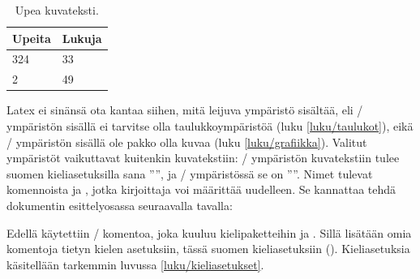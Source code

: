 \begin{esimerkki*}

\begin{koodilohko}
\begin{table}
  \begin{center}
    \renewcommand{\arraystretch}{1.3}
    \begin{tabular}{ll}
      Upeita & Lukuja \\
      \hline
      324 & 33 \\
      2   & 49 \\
      \hline
    \end{tabular}
  \end{center}
  \caption{Upea kuvateksti.}
\end{table}
\end{koodilohko}

  \caption{Leijuvan taulukon toteuttaminen \-/
    ympäristön avulla. Varsinainen taulukko syntyy ympäristön
     avulla}
  \label{esim/leijuosat-perus}
\end{esimerkki*}

Latex ei sinänsä ota kantaa siihen, mitä leijuva ympäristö sisältää, eli
\-/ ympäristön sisällä ei tarvitse olla
taulukkoympäristöä (luku \ref{luku/taulukot}), eikä
\-/ ympäristön sisällä ole pakko olla kuvaa (luku
\ref{luku/grafiikka}). Valitut ympäristöt vaikuttavat kuitenkin
kuvatekstiin: \-/ ympäristön kuvatekstiin tulee suomen
kieliasetuksilla sana ''\tablename'', ja \-/
ympäristössä se on ''\figurename''. Nimet tulevat komennoista
 ja , jotka kirjoittaja voi
määrittää uudelleen. Se kannattaa tehdä dokumentin esittelyosassa
seuraavalla tavalla:

\begin{koodilohkosis}
\addto{\captionsfinnish}{
  \renewcommand{\tablename}{Hökötys}
  \renewcommand{\figurename}{Himmeli}
}
\end{koodilohkosis}

\noindent
Edellä käytettiin \-/ komentoa, joka kuuluu
kielipaketteihin  ja . Sillä
lisätään omia komentoja tietyn kielen asetuksiin, tässä suomen
kieliasetuksiin (). Kieliasetuksia käsitellään
tarkemmin luvussa \ref{luku/kieliasetukset}.

